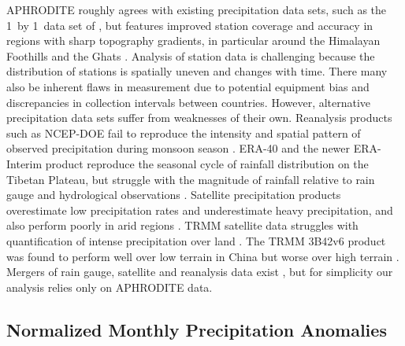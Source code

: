 	APHRODITE roughly agrees with existing precipitation data sets, such as the 1\textdegree\ by 1\textdegree\ data set of \cite{Rajeevan2006}, but features improved station coverage and accuracy in regions with sharp topography gradients, in particular around the Himalayan Foothills and the Ghats \citep{Yatagai2012}. Analysis of station data is challenging because the distribution of stations is spatially uneven and changes with time. There many also be inherent flaws in measurement due to potential equipment bias and discrepancies in collection intervals between countries. However, alternative precipitation data sets suffer from weaknesses of their own. Reanalysis products such as NCEP-DOE fail to reproduce the intensity and spatial pattern of observed precipitation during monsoon season \citep{Pena-Arancibia2013}. ERA-40 and the newer ERA-Interim product reproduce the seasonal cycle of rainfall distribution on the Tibetan Plateau, but struggle with the magnitude of rainfall relative to rain gauge and hydrological observations \citep{Tong2014}. Satellite precipitation products overestimate low precipitation rates and underestimate heavy precipitation, and also perform poorly in arid regions \citep{Gao2013a}. TRMM satellite data struggles with quantification of intense precipitation over land \citep{Iguchi2009}. The TRMM 3B42v6 product was found to perform well over low terrain in China but worse over high terrain \citep{Zhao2013}. Mergers of rain gauge, satellite and reanalysis data exist \citep{Pena-Arancibia2013,Shen2014}, but for simplicity our analysis relies only on APHRODITE data.
	
\subsection{Normalized Monthly Precipitation Anomalies}

